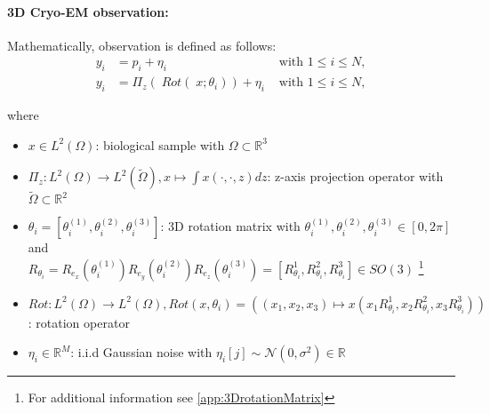 \paragraph{3D Cryo-EM observation:}
Mathematically, observation is defined as follows:
\begin{equation}
    \label{eq:cryoEmSimple}
    \begin{aligned}
        y_i &= p_i + \eta_i &\text{ with } 1 \leq i \leq N,\\
        y_i &= \Pi_z  (\; Rot (\;x; \theta_i )) + \eta_i &\text{ with } 1 \leq i \leq N,    
    \end{aligned}
\end{equation}

where 
\begin{itemize}
    \item $x \in L^2(\Omega)$: biological sample with $\Omega \subset \mathbb{R}^3 $
    \item $\Pi_z : L^2(\Omega) \to L^2(\tilde{\Omega}), x \mapsto  \int x(\cdot,\cdot,z) dz$: z-axis projection operator
          with $\tilde{\Omega} \subset \mathbb{R}^2$
    \item $\theta_i = [\theta_i^{(1)}, \theta_i^{(2)}, \theta_i^{(3)} ] $: 3D rotation matrix with $ \theta_i^{(1)}, \theta_i^{(2)}, \theta_i^{(3)} \in [0, 2 \pi]$ and \\
          $R_{\theta_i} =  R_{e_x} (\theta_i^{(1)}) R_{e_y} (\theta_i^{(2)}) R_{e_z} (\theta_i^{(3)}) = [R^1_{\theta_i}, R^2_{\theta_i}, R^3_{\theta_i}] \in SO(3)$ 
          \footnote{For additional information see \ref{app:3DrotationMatrix}}
          
    \item $\textit{Rot} : L^2(\Omega) \to L^2(\Omega), \textit{Rot}(x, \theta_i) = \left((x_1,x_2,x_3) \mapsto x( x_1R^1_{\theta_i}, x_2R^2_{\theta_i}, x_3R^3_{\theta_i})\right)$: rotation operator
    \item $\eta_i \in \mathbb{R}^M$: i.i.d Gaussian noise with $\eta_i[j] \sim \mathcal{N}(0,\sigma^2) \in \mathbb{R}$
\end{itemize}



